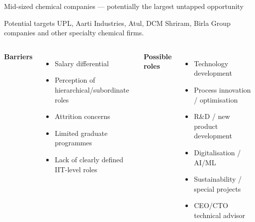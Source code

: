 \documentclass[aspectratio=169,11pt]{beamer}
\begin{document}
\begin{frame}{Mid-sized chemical companies — potentially the largest untapped opportunity}
\begin{block}{Potential targets}
UPL, Aarti Industries, Atul, DCM Shriram, Birla Group companies and other specialty chemical firms.
\end{block}
\begin{columns}[T]
\textbf{Barriers}
\begin{itemize}
\item Salary differential
\item Perception of hierarchical/subordinate roles
\item Attrition concerns
\item Limited graduate programmes
\item Lack of clearly defined IIT-level roles
\end{itemize}
\textbf{Possible roles}
\begin{itemize}
\item Technology development
\item Process innovation / optimisation
\item R\&D / new product development
\item Digitalisation / AI/ML
\item Sustainability / special projects
\item CEO/CTO technical advisor
\end{itemize}
\end{columns}
\end{frame}
\end{document}
